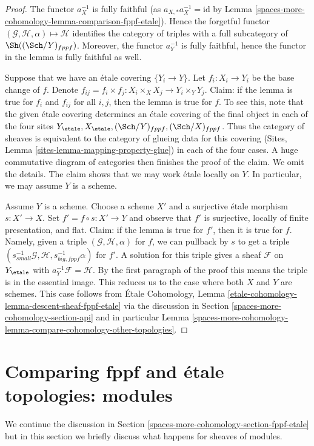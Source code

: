 \begin{proof}
The functor $a_X^{-1}$ is fully faithful (as $a_{X, *}a_X^{-1} = \text{id}$ by
Lemma \ref{spaces-more-cohomology-lemma-comparison-fppf-etale}). Hence the forgetful functor
$(\mathcal{G}, \mathcal{H}, \alpha) \mapsto \mathcal{H}$ identifies the
category of triples with a full subcategory of $\Sh((\Sch/Y)_{fppf})$.
Moreover, the functor $a_Y^{-1}$ is fully faithful, hence the functor
in the lemma is fully faithful as well.

\medskip\noindent
Suppose that we have an \'etale covering $\{Y_i \to Y\}$.
Let $f_i : X_i \to Y_i$ be the base change of $f$.
Denote $f_{ij} = f_i \times f_j : X_i \times_X X_j  \to Y_i \times_Y Y_j$.
Claim: if the lemma is true for $f_i$ and $f_{ij}$ for all $i, j$, then
the lemma is true for $f$. To see this, note that the given \'etale covering
determines an \'etale covering of the final object in each of
the four sites $Y_\etale, X_\etale, (\Sch/Y)_{fppf}, (\Sch/X)_{fppf}$.
Thus the category of sheaves is equivalent to the category of
glueing data for this covering
(Sites, Lemma \ref{sites-lemma-mapping-property-glue})
in each of the four cases. A huge commutative diagram of
categories then finishes the proof of the claim. We omit the details.
The claim shows that we may work \'etale locally on $Y$.
In particular, we may assume $Y$ is a scheme.

\medskip\noindent
Assume $Y$ is a scheme. Choose a scheme $X'$ and a surjective \'etale
morphism $s : X' \to X$. Set $f' = f \circ s : X' \to Y$ and observe
that $f'$ is surjective, locally of finite presentation, and flat.
Claim: if the lemma is true for $f'$, then it is true for $f$.
Namely, given a triple $(\mathcal{G}, \mathcal{H}, \alpha)$
for $f$, we can pullback by $s$ to get a triple
$(s_{small}^{-1}\mathcal{G}, \mathcal{H}, s_{big, fppf}^{-1}\alpha)$
for $f'$. A solution for this triple gives a sheaf
$\mathcal{F}$ on $Y_\etale$ with $a_Y^{-1}\mathcal{F} = \mathcal{H}$.
By the first paragraph of the proof this means the triple is
in the essential image. This reduces us to the case
where both $X$ and $Y$ are schemes. This case follows from
\'Etale Cohomology, Lemma
\ref{etale-cohomology-lemma-descent-sheaf-fppf-etale}
via the discussion in Section \ref{spaces-more-cohomology-section-api}
and in particular Lemma \ref{spaces-more-cohomology-lemma-compare-cohomology-other-topologies}.
\end{proof}

\section{Comparing fppf and \'etale topologies: modules}
\label{spaces-more-cohomology-section-fppf-etale-modules}
We continue the discussion in Section \ref{spaces-more-cohomology-section-fppf-etale} but in this
section we briefly discuss what happens for sheaves of modules.

